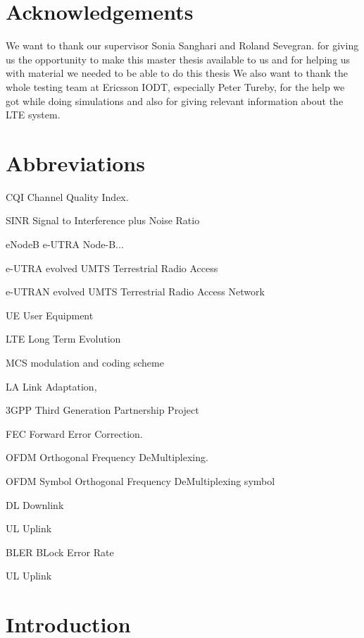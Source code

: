 \documentclass[cropmarks, frame, english]{idamasterthesis}
\author{Paul Nedstrand \& Razmus Lindgren}
\newcommand{\abbrlabel}[1]{\makebox[3cm][l]{\textbf{#1}\ \dotfill}}
\newenvironment{abbreviations}{\begin{list}{}{\renewcommand{\makelabel}{\abbrlabel}}}{\end{list}}
\begin{document}
\makeintropages

\chapter*{Acknowledgements}
We want to thank our supervisor Sonia Sanghari and Roland Sevegran. for giving us the opportunity to make this master thesis available to us and for helping us with material we needed to be able to do this thesis
We also want to thank the whole testing team at Ericsson IODT, especially Peter Tureby, for the help we got while doing simulations and also for giving relevant information about the LTE system.

\chapter*{Abbreviations}

\begin{abbreviations}
\item[CQI] Channel Quality Index.
\item[SINR] Signal to Interference plus Noise Ratio
\item[eNodeB] e-UTRA Node-B...
\item[e-UTRA] evolved UMTS Terrestrial Radio Access
\item[e-UTRAN] evolved UMTS Terrestrial Radio Access Network
\item[UE] User Equipment
\item[LTE] Long Term Evolution
\item[MCS] modulation and coding scheme
\item[LA] Link Adaptation,
\item[3GPP] Third Generation Partnership Project
\item[FEC] Forward Error Correction.
\item[OFDM] Orthogonal Frequency DeMultiplexing.
\item[OFDM Symbol] Orthogonal Frequency DeMultiplexing symbol
\item[DL] Downlink
\item[UL] Uplink
\item[BLER] BLock Error Rate
\item[UL] Uplink


\end{abbreviations}



\chapter{Introduction}
\end{document}
